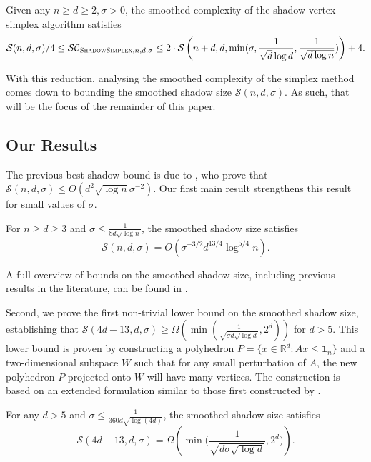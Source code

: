 \documentclass{theoretics}
\newcommand{\R}{\mathbb R}
\begin{document}
\begin{theorem}
    Given any $n \geq d \geq 2, \sigma > 0$, the smoothed complexity of the shadow vertex simplex algorithm satisfies
    \begin{align*}
        \mathcal{S}(n, d, \sigma)/4 \leq \mathcal{SC}_{\textsc{ShadowSimplex}, n, d, \sigma} \leq 2\cdot\mathcal{S}\left(n + d, d, \min(\sigma, \frac{1}{\sqrt{d} \log d}, \frac{1}{\sqrt{d \log n}}) \right) + 4.
    \end{align*}
\end{theorem}

With this reduction, analysing the smoothed complexity of the simplex method
comes down to bounding the smoothed shadow size $\mathcal S(n,d,\sigma)$.
As such, that will be the focus of the remainder of this paper.

\subsection{Our Results}
The previous best shadow bound is due to \cite{DH18}, who prove that $\mathcal S(n,d,\sigma) \leq O(d^2 \sqrt{\log n}\sigma^{-2})$.
Our first main result strengthens this result for small values of $\sigma$.
\begin{theorem}
    For $n \geq d \geq 3$ and $\sigma \leq \frac{1}{8d\sqrt{\log n}}$,
    the smoothed shadow size satisfies
    \[
        \mathcal S(n,d,\sigma) = O\left( \sigma^{-3/2} d^{13/4} \log^{5/4} n \right).
    \]
\end{theorem}
A full overview of bounds on the smoothed shadow size, including previous results in the literature, can be found in
.

Second, we prove the first non-trivial lower bound on the smoothed shadow size, establishing that
$\mathcal S(4d-13,d,\sigma) \geq \Omega(\min(\frac{1}{\sqrt{\sigma d \sqrt{\log d}}}, 2^d))$
for $d > 5$. This lower bound is proven by constructing a polyhedron
$P = \{x \in \R^d : Ax \leq \mathbf 1_n\}$ and a two-dimensional subspace $W$ such that
for any small perturbation of $A$, the new polyhedron $P$ projected onto $W$ will have many vertices.
The construction is based on an extended formulation similar to those first constructed by
\cite{BN01, glineur}.
\begin{theorem}
    For any $d > 5$ and $\sigma \leq \frac{1}{360d\sqrt{\log(4d)}}$,
    the smoothed shadow size satisfies
    \[
        \mathcal S(4d-13,d,\sigma) = \Omega \left(\min \Big(\frac{1}{\sqrt{d\sigma\sqrt{\log d}}},2^d \Big) \right).
    \]
\end{theorem}
\end{document}
